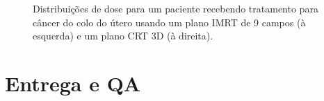 \documentclass[11pt,a4paper]{article}
\begin{document}
	\begin{figure}[h]
		\centering
		\caption{Distribuições de dose para um paciente recebendo tratamento para câncer do colo do útero usando um plano IMRT de 9 campos (à esquerda) e um plano CRT 3D (à direita).}
		\label{fig:imrt9campos}
	\end{figure}

	
	
\section{Entrega e QA}




\end{document}
